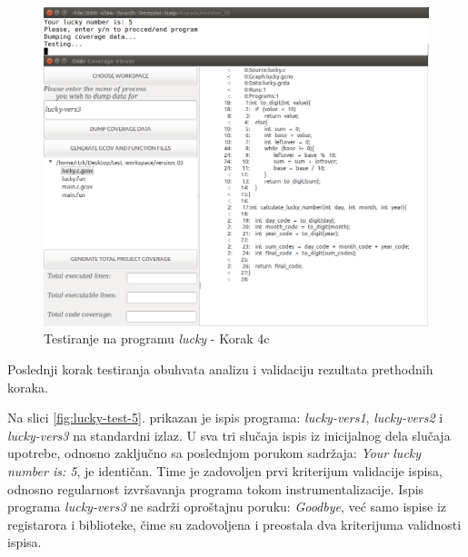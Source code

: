\documentclass[12pt,oneside]{memoir}
\newcommand{\strano}[1]{\textit{#1}}
\begin{document}
\begin{figure}[!ht]
  \centering
  \includegraphics[width=\textwidth]{img/lucky4-ng.png}
  \caption{Testiranje na programu \strano{lucky} - Korak 4c}
  \label{fig:lucky-test-4}
\end{figure}

Poslednji korak testiranja obuhvata analizu i validaciju rezultata prethodnih koraka. 

Na slici \ref{fig:lucky-test-5}. prikazan je ispis programa: \strano{lucky-vers1}, \strano{lucky-vers2} i \strano{lucky-vers3} na standardni izlaz. U sva tri slučaja ispis iz inicijalnog dela slučaja upotrebe, odnosno zaključno sa poslednjom porukom sadržaja: \strano{Your lucky number is: 5}, je identičan. Time je zadovoljen prvi kriterijum validacije ispisa, odnosno regularnost izvršavanja programa tokom instrumentalizacije. Ispis programa \strano{lucky-vers3} ne sadrži oproštajnu poruku: \strano{Goodbye}, već samo ispise iz registarora i biblioteke, čime su zadovoljena i preostala dva kriterijuma validnosti ispisa. 
\end{document}
